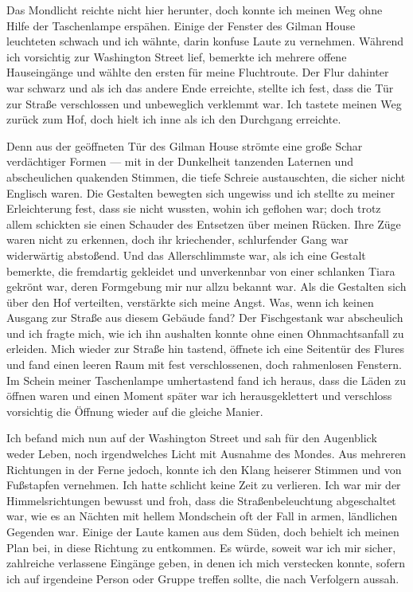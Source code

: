 Das Mondlicht reichte nicht hier herunter, doch konnte ich meinen Weg ohne Hilfe der Taschenlampe erspähen. Einige der Fenster des Gilman House leuchteten schwach und ich wähnte, darin konfuse Laute zu vernehmen. Während ich vorsichtig zur Washington Street lief, bemerkte ich mehrere offene Hauseingänge und wählte den ersten für meine Fluchtroute. Der Flur dahinter war schwarz und als ich das andere Ende erreichte, stellte ich fest, dass die Tür zur Straße verschlossen und unbeweglich verklemmt war. Ich tastete meinen Weg zurück zum Hof, doch hielt ich inne als ich den Durchgang erreichte.

Denn aus der geöffneten Tür des Gilman House strömte eine große Schar verdächtiger Formen --- mit in der Dunkelheit tanzenden Laternen und abscheulichen quakenden Stimmen, die tiefe Schreie austauschten, die sicher nicht Englisch waren. Die Gestalten bewegten sich ungewiss und ich stellte zu meiner Erleichterung fest, dass sie nicht wussten, wohin ich geflohen war; doch trotz allem schickten sie einen Schauder des Entsetzen über meinen Rücken. Ihre Züge waren nicht zu erkennen, doch ihr kriechender, schlurfender Gang war widerwärtig abstoßend. Und das Allerschlimmste war, als ich eine Gestalt bemerkte, die fremdartig gekleidet und unverkennbar von einer schlanken Tiara gekrönt war, deren Formgebung mir nur allzu bekannt war. Als die Gestalten sich über den Hof verteilten, verstärkte sich meine Angst. Was, wenn ich keinen Ausgang zur Straße aus diesem Gebäude fand? Der Fischgestank war abscheulich und ich fragte mich, wie ich ihn aushalten konnte ohne einen Ohnmachtsanfall zu erleiden. Mich wieder zur Straße hin tastend, öffnete ich eine Seitentür des Flures und fand einen leeren Raum mit fest verschlossenen, doch rahmenlosen Fenstern. Im Schein meiner Taschenlampe umhertastend fand ich heraus, dass die Läden zu öffnen waren und einen Moment später war ich herausgeklettert und verschloss vorsichtig die Öffnung wieder auf die gleiche Manier.

Ich befand mich nun auf der Washington Street und sah für den Augenblick weder Leben, noch irgendwelches Licht mit Ausnahme des Mondes. Aus mehreren Richtungen in der Ferne jedoch, konnte ich den Klang heiserer Stimmen und von Fußstapfen vernehmen. Ich hatte schlicht keine Zeit zu verlieren. Ich war mir der Himmelsrichtungen bewusst und froh, dass die Straßenbeleuchtung abgeschaltet war, wie es an Nächten mit hellem Mondschein oft der Fall in armen, ländlichen Gegenden war. Einige der Laute kamen aus dem Süden, doch behielt ich meinen Plan bei, in diese Richtung zu entkommen. Es würde, soweit war ich mir sicher, zahlreiche verlassene Eingänge geben, in denen ich mich verstecken konnte, sofern ich auf irgendeine Person oder Gruppe treffen sollte, die nach Verfolgern aussah.

